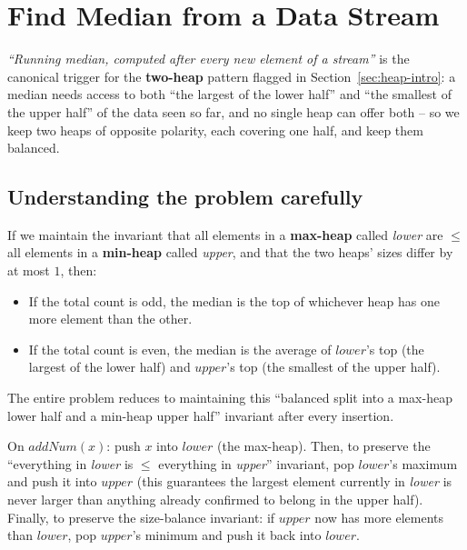 \section{Find Median from a Data Stream}
\label{sec:heap-median-stream}


\begin{patternbox}
\emph{``Running median, computed after every new element of a stream''}
is the canonical trigger for the \textbf{two-heap} pattern flagged in
Section~\ref{sec:heap-intro}: a median needs access to both ``the largest
of the lower half'' and ``the smallest of the upper half'' of the data
seen so far, and no single heap can offer both -- so we keep two heaps of
opposite polarity, each covering one half, and keep them balanced.
\end{patternbox}

\subsection*{Understanding the problem carefully}

If we maintain the invariant that all elements in a \textbf{max-heap}
called \textit{lower} are $\le$ all elements in a \textbf{min-heap} called
\textit{upper}, and that the two heaps' sizes differ by at most $1$, then:

\begin{itemize}
  \item If the total count is odd, the median is the top of whichever
        heap has one more element than the other.
  \item If the total count is even, the median is the average of
        $\textit{lower}$'s top (the largest of the lower half) and
        $\textit{upper}$'s top (the smallest of the upper half).
\end{itemize}

The entire problem reduces to maintaining this ``balanced split into a
max-heap lower half and a min-heap upper half'' invariant after every
insertion.

\begin{ideabox}
On $\textit{addNum}(x)$: push $x$ into $\textit{lower}$ (the max-heap).
Then, to preserve the ``everything in \textit{lower} is $\le$ everything in
\textit{upper}'' invariant, pop $\textit{lower}$'s maximum and push it into
$\textit{upper}$ (this guarantees the largest element currently in
\textit{lower} is never larger than anything already confirmed to belong
in the upper half). Finally, to preserve the size-balance invariant: if
$\textit{upper}$ now has more elements than $\textit{lower}$, pop
$\textit{upper}$'s minimum and push it back into $\textit{lower}$.
\end{ideabox}

